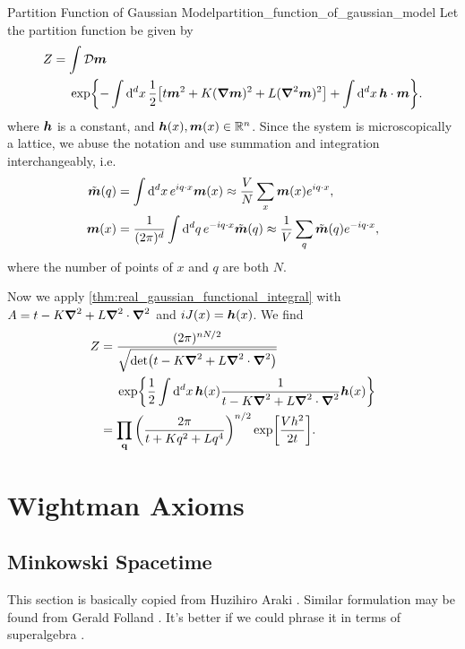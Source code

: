\documentclass{article}
\begin{document}
\begin{example}{Partition Function of Gaussian Model}{partition_function_of_gaussian_model}
    Let the partition function be given by
    \begin{align*}
        Z &= \int \mathcal{D}\vb*{m} \\
        &\phantom{{}={}}\exp{-\int \dd{^d x} \frac{1}{2}\qty[t{\vb*{m}}^2 + K(\grad \vb*{m})^2 + L(\grad^2 \vb*{m})^2] + \int \dd{^d x} \vb*{h} \cdot \vb*{m}}.
    \end{align*}
    where $\vb*{h}$ is a constant, and $\vb*{h}(x), \vb*{m}(x) \in \mathbb{R}^n$.
    Since the system is microscopically a lattice, we abuse the notation and use summation and integration interchangeably, i.e.
    \begin{align*}
        \tilde{\vb*{m}}(q) &= \int \dd{^d x} e^{iq\cdot x} \vb*{m}(x) \approx \frac{V}{N} \sum_{x} \vb*{m}(x) e^{iq\cdot x}, \\
        \vb*{m}(x) &= \frac{1}{(2\pi)^d}\int \dd{^d q} e^{-iq\cdot x} \tilde{\vb*{m}}(q) \approx \frac{1}{V} \sum_{q} \tilde{\vb*{m}}(q) e^{-iq\cdot x},
    \end{align*}
    where the number of points of $x$ and $q$ are both $N$.
    \par
    Now we apply \cref{thm:real_gaussian_functional_integral} with $A = t - K\grad^2 + L \grad^2 \cdot \grad^2$ and $iJ(x) = \vb*{h}(x)$. We find
    \begin{align*}
        Z &= \frac{(2\pi)^{nN/2}}{\sqrt{\det (t - K\grad^2 + L \grad^2 \cdot \grad^2)}} \\
        &\phantom{{}={}}\exp{\frac{1}{2} \int \dd{^d x} \vb*{h}(x) \frac{1}{t - K\grad^2 + L \grad^2 \cdot \grad^2} \vb*{h}(x)} \\
        &= \prod_{\vb{q}} \qty(\frac{2\pi}{t + Kq^2 + Lq^4})^{n/2} \exp[\frac{Vh^2}{2t}].
    \end{align*}
\end{example}

\section{Wightman Axioms}

\subsection{Minkowski Spacetime}

This section is basically copied from Huzihiro Araki \cite{Araki_Huzihiro2009-07-05}.
Similar formulation may be found from Gerald Folland \cite{Gerald_B_Folland2008-08-26}.
It's better if we could phrase it in terms of superalgebra \cite{Pierre_Deligne1999-06}.
\end{document}
